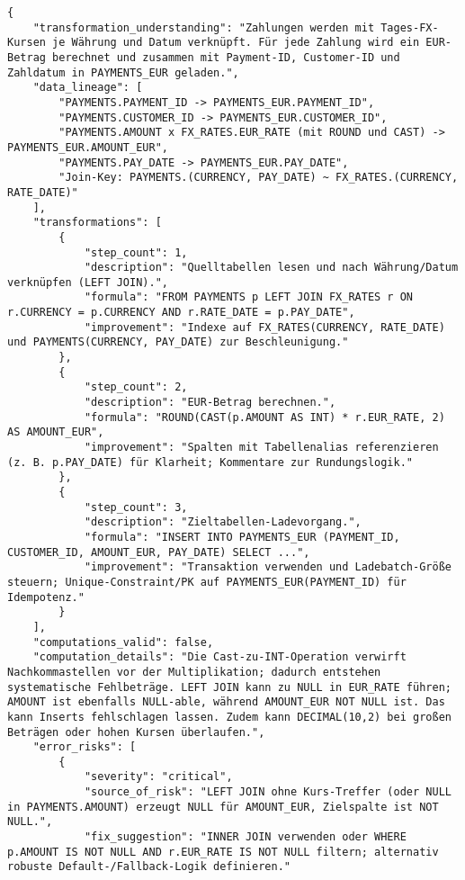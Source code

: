 \begin{lstlisting}[caption={Ausgabe: GPT-5 Anwendungsfall 4 Konsistenzdurchlauf},label={gpt_case4_prompt2}]
{
    "transformation_understanding": "Zahlungen werden mit Tages-FX-Kursen je Währung und Datum verknüpft. Für jede Zahlung wird ein EUR-Betrag berechnet und zusammen mit Payment-ID, Customer-ID und Zahldatum in PAYMENTS_EUR geladen.",
    "data_lineage": [
        "PAYMENTS.PAYMENT_ID -> PAYMENTS_EUR.PAYMENT_ID",
        "PAYMENTS.CUSTOMER_ID -> PAYMENTS_EUR.CUSTOMER_ID",
        "PAYMENTS.AMOUNT x FX_RATES.EUR_RATE (mit ROUND und CAST) -> PAYMENTS_EUR.AMOUNT_EUR",
        "PAYMENTS.PAY_DATE -> PAYMENTS_EUR.PAY_DATE",
        "Join-Key: PAYMENTS.(CURRENCY, PAY_DATE) ~ FX_RATES.(CURRENCY, RATE_DATE)"
    ],
    "transformations": [
        {
            "step_count": 1,
            "description": "Quelltabellen lesen und nach Währung/Datum verknüpfen (LEFT JOIN).",
            "formula": "FROM PAYMENTS p LEFT JOIN FX_RATES r ON r.CURRENCY = p.CURRENCY AND r.RATE_DATE = p.PAY_DATE",
            "improvement": "Indexe auf FX_RATES(CURRENCY, RATE_DATE) und PAYMENTS(CURRENCY, PAY_DATE) zur Beschleunigung."
        },
        {
            "step_count": 2,
            "description": "EUR-Betrag berechnen.",
            "formula": "ROUND(CAST(p.AMOUNT AS INT) * r.EUR_RATE, 2) AS AMOUNT_EUR",
            "improvement": "Spalten mit Tabellenalias referenzieren (z. B. p.PAY_DATE) für Klarheit; Kommentare zur Rundungslogik."
        },
        {
            "step_count": 3,
            "description": "Zieltabellen-Ladevorgang.",
            "formula": "INSERT INTO PAYMENTS_EUR (PAYMENT_ID, CUSTOMER_ID, AMOUNT_EUR, PAY_DATE) SELECT ...",
            "improvement": "Transaktion verwenden und Ladebatch-Größe steuern; Unique-Constraint/PK auf PAYMENTS_EUR(PAYMENT_ID) für Idempotenz."
        }
    ],
    "computations_valid": false,
    "computation_details": "Die Cast-zu-INT-Operation verwirft Nachkommastellen vor der Multiplikation; dadurch entstehen systematische Fehlbeträge. LEFT JOIN kann zu NULL in EUR_RATE führen; AMOUNT ist ebenfalls NULL-able, während AMOUNT_EUR NOT NULL ist. Das kann Inserts fehlschlagen lassen. Zudem kann DECIMAL(10,2) bei großen Beträgen oder hohen Kursen überlaufen.",
    "error_risks": [
        {
            "severity": "critical",
            "source_of_risk": "LEFT JOIN ohne Kurs-Treffer (oder NULL in PAYMENTS.AMOUNT) erzeugt NULL für AMOUNT_EUR, Zielspalte ist NOT NULL.",
            "fix_suggestion": "INNER JOIN verwenden oder WHERE p.AMOUNT IS NOT NULL AND r.EUR_RATE IS NOT NULL filtern; alternativ robuste Default-/Fallback-Logik definieren."

\end{lstlisting}
